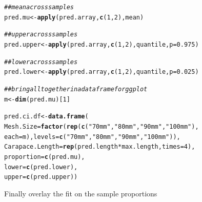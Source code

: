 \documentclass[12pt]{article}\usepackage[]{graphicx}\usepackage[]{color}
\makeatletter
\newcommand{\hlnum}[1]{\textcolor[rgb]{0.686,0.059,0.569}{#1}}%
\newcommand{\hlstr}[1]{\textcolor[rgb]{0.192,0.494,0.8}{#1}}%
\newcommand{\hlcom}[1]{\textcolor[rgb]{0.678,0.584,0.686}{\textit{#1}}}%
\newcommand{\hlopt}[1]{\textcolor[rgb]{0,0,0}{#1}}%
\newcommand{\hlstd}[1]{\textcolor[rgb]{0.345,0.345,0.345}{#1}}%
\newcommand{\hlkwb}[1]{\textcolor[rgb]{0.69,0.353,0.396}{#1}}%
\newcommand{\hlkwc}[1]{\textcolor[rgb]{0.333,0.667,0.333}{#1}}%
\newcommand{\hlkwd}[1]{\textcolor[rgb]{0.737,0.353,0.396}{\textbf{#1}}}%
\newenvironment{kframe}{%
 \def\at@end@of@kframe{}%
 \ifinner\ifhmode%
  \def\at@end@of@kframe{\end{minipage}}%
  \begin{minipage}{\columnwidth}%
 \fi\fi%
 \def\FrameCommand##1{\hskip\@totalleftmargin \hskip-\fboxsep
 \colorbox{shadecolor}{##1}\hskip-\fboxsep
     \hskip-\linewidth \hskip-\@totalleftmargin \hskip\columnwidth}%
 \MakeFramed {\advance\hsize-\width
   \@totalleftmargin\z@ \linewidth\hsize
   \@setminipage}}%
 {\par\unskip\endMakeFramed%
 \at@end@of@kframe}
\newenvironment{knitrout}{}{} %
\makeatother
\begin{document}
\begin{knitrout}
\begin{kframe}
\begin{alltt}
\hlcom{## mean across samples}
\hlstd{pred.mu} \hlkwb{<-} \hlkwd{apply}\hlstd{(pred.array,} \hlkwd{c}\hlstd{(}\hlnum{1}\hlstd{,} \hlnum{2}\hlstd{), mean)}

\hlcom{## upper across samples}
\hlstd{pred.upper} \hlkwb{<-} \hlkwd{apply}\hlstd{(pred.array,} \hlkwd{c}\hlstd{(}\hlnum{1}\hlstd{,} \hlnum{2}\hlstd{), quantile,} \hlkwc{p} \hlstd{=} \hlnum{0.975}\hlstd{)}

\hlcom{## lower across samples}
\hlstd{pred.lower} \hlkwb{<-} \hlkwd{apply}\hlstd{(pred.array,} \hlkwd{c}\hlstd{(}\hlnum{1}\hlstd{,} \hlnum{2}\hlstd{), quantile,} \hlkwc{p} \hlstd{=} \hlnum{0.025}\hlstd{)}

\hlcom{## bring all together in a data frame for ggplot}
\hlstd{m} \hlkwb{<-} \hlkwd{dim}\hlstd{(pred.mu)[}\hlnum{1}\hlstd{]}

\hlstd{pred.ci.df} \hlkwb{<-} \hlkwd{data.frame}\hlstd{(}
               \hlkwc{Mesh.Size} \hlstd{=} \hlkwd{factor}\hlstd{(}\hlkwd{rep}\hlstd{(}\hlkwd{c}\hlstd{(}\hlstr{"70mm"}\hlstd{,} \hlstr{"80mm"}\hlstd{,} \hlstr{"90mm"}\hlstd{,} \hlstr{"100mm"}\hlstd{),}
                 \hlkwc{each} \hlstd{= m),} \hlkwc{levels} \hlstd{=} \hlkwd{c}\hlstd{(}\hlstr{"70mm"}\hlstd{,} \hlstr{"80mm"}\hlstd{,} \hlstr{"90mm"}\hlstd{,} \hlstr{"100mm"}\hlstd{)),}
               \hlkwc{Carapace.Length} \hlstd{=} \hlkwd{rep}\hlstd{(pred.length} \hlopt{*} \hlstd{max.length,} \hlkwc{times} \hlstd{=} \hlnum{4}\hlstd{),}
               \hlkwc{proportion} \hlstd{=} \hlkwd{c}\hlstd{(pred.mu),}
               \hlkwc{lower} \hlstd{=} \hlkwd{c}\hlstd{(pred.lower),}
               \hlkwc{upper} \hlstd{=} \hlkwd{c}\hlstd{(pred.upper))}
\end{alltt}
\end{kframe}
\end{knitrout}

Finally overlay the fit on the sample proportions
\end{document}
